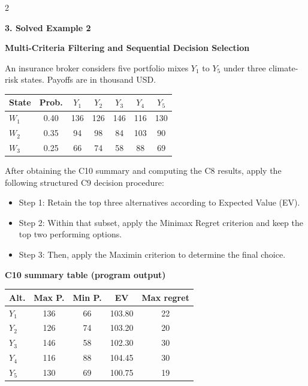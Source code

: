 \documentclass[12pt]{article}
\newcommand{\SubsectionBox}[1]{%
	\noindent\colorbox{gray!30}{%
		\parbox{\linewidth}{\textbf{#1}}%
	}\par\vspace{0.35cm}%
}
\begin{document}
\begin{multicols}{2}
		
		\SubsectionBox{3. Solved Example 2}
		
		\textbf{Multi-Criteria Filtering and Sequential Decision Selection}\par
		An insurance broker considers five portfolio mixes $Y_1$ to $Y_5$ under three climate-risk states. 
		Payoffs are in thousand USD.

		\begin{center}
			\begin{tabular}{l c c c c c c}
				\hline
				State & Prob. & $Y_1$ & $Y_2$ & $Y_3$ & $Y_4$ & $Y_5$ \\
				\hline
				$W_1$ & 0.40 & 136 & 126 & 146 & 116 & 130 \\
				$W_2$ & 0.35 & 94 & 98 & 84 & 103 & 90 \\
				$W_3$ & 0.25 & 66 & 74 & 58 & 88 & 69 \\
				\hline
			\end{tabular}
		\end{center}
		
		After obtaining the C10 summary and computing the C8 results, apply the following structured C9 decision procedure:
		\begin{itemize}
			\item Step 1: Retain the top three alternatives according to Expected Value (EV).
			\item Step 2: Within that subset, apply the Minimax Regret criterion and keep the top two performing options.
			\item Step 3: Then, apply the Maximin criterion to determine the final choice.
		\end{itemize}
		
		\textbf{C10 summary table (program output)}\par
		\begin{center}
			\begin{tabular}{l c c c c}
				\hline
				Alt. & Max P. & Min P. & EV & Max regret \\
				\hline
				$Y_1$ & 136 & 66 & 103.80 & 22 \\
				$Y_2$ & 126 & 74 & 103.20 & 20 \\
				$Y_3$ & 146 & 58 & 102.30 & 30 \\
				$Y_4$ & 116 & 88 & 104.45 & 30 \\
				$Y_5$ & 130 & 69 & 100.75 & 19 \\
				\hline
			\end{tabular}
		\end{center}
		

\end{multicols}
\end{document}
